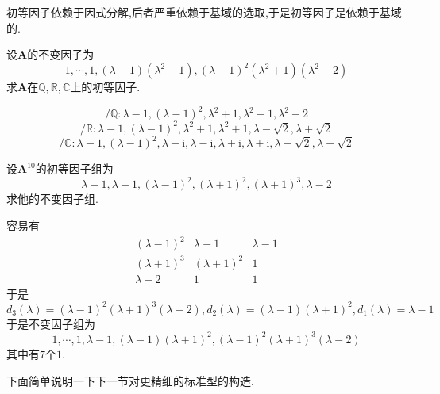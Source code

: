 \begin{red}
\begin{remark}
    初等因子依赖于因式分解,后者严重依赖于基域的选取,于是初等因子是依赖于基域的.
\end{remark}
\end{red}
\begin{brown}
\begin{example}
    设$\bm{A}$的不变因子为\[
    1,\cdots,1,\left(\lambda-1\right)\left(\lambda^2+1\right),\left(\lambda-1\right)^2\left(\lambda^2+1\right)\left(\lambda^2-2\right)
    \]求$\bm{A}$在$\mathbb{Q},\mathbb{R},\mathbb{C}$上的初等因子.
\end{example}
\begin{solution}
    \[
    /\mathbb{Q}:\lambda-1,\left(\lambda-1\right)^2,\lambda^2+1,\lambda^2+1,\lambda^2-2
    \]
    \[
    /\mathbb{R}:\lambda-1,\left(\lambda-1\right)^2,\lambda^2+1,\lambda^2+1,\lambda-\sqrt{2},\lambda+\sqrt{2}
    \]
    \[
    /\mathbb{C}:\lambda-1,\left(\lambda-1\right)^2,\lambda-\mathrm{i},\lambda-\mathrm{i},\lambda+\mathrm{i},\lambda+\mathrm{i},\lambda-\sqrt{2},\lambda+\sqrt{2}
    \]
\end{solution}
\end{brown}
\begin{brown}
\begin{example}
    设$\bm{A}^{10}$的初等因子组为\[
    \lambda-1,\lambda-1,\left(\lambda-1\right)^2,\left(\lambda+1\right)^2,\left(\lambda+1\right)^3,\lambda-2
    \]求他的不变因子组.
\end{example}
\begin{solution}
    容易有\[
    \begin{matrix}
        \left(\lambda-1\right)^2&\lambda-1&\lambda-1\\
        \left(\lambda+1\right)^3&\left(\lambda+1\right)^2&1\\
        \lambda-2&1&1
    \end{matrix}
    \]于是\[
    d_3\left(\lambda\right)=\left(\lambda-1\right)^2\left(\lambda+1\right)^3\left(\lambda-2\right),d_2\left(\lambda\right)=\left(\lambda-1\right)\left(\lambda+1\right)^2,d_1\left(\lambda\right)=\lambda-1
    \]于是不变因子组为
    \[
    1,\cdots,1, \lambda-1,\left(\lambda-1\right)\left(\lambda+1\right)^2,\left(\lambda-1\right)^2\left(\lambda+1\right)^3\left(\lambda-2\right)
    \]其中有$7$个$1$.
\end{solution}
\end{brown}
下面简单说明一下下一节对更精细的标准型的构造.

